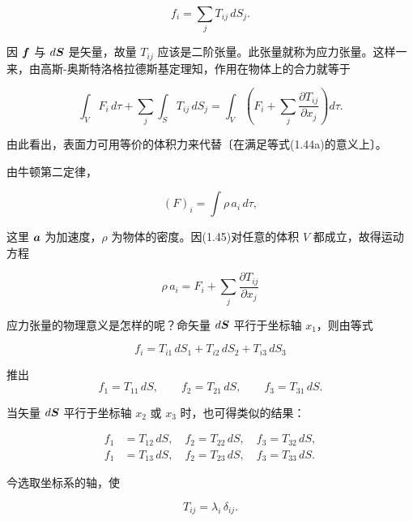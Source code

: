 \begin{equation*}
f_i = \sum_{j} T_{ij}\, dS_j.
\end{equation*}

因 $\bm{f}$ 与 $d\bm{S}$ 是矢量，故量 $T_{ij}$ 应该是二阶张量。此张量就称为应力张量。这样一来，由高斯-奥斯特洛格拉德斯基定理知，作用在物体上的合力就等于

\begin{equation}
\int_{V} F_i\, d\tau + \sum_{j} \int_{S} T_{ij}\, dS_j = \int_{V} \left(F_i + \sum_{j} \frac{\partial T_{ij}}{\partial x_j}\right) d\tau.
\tag{1.44a}
\end{equation}

由此看出，表面力可用等价的体积力来代替〔在满足等式(1.44a)的意义上〕。

由牛顿第二定律，

\begin{equation}
(F)_i = \int \rho\, a_i\, d\tau,
\tag{1.45}
\end{equation}

这里 $\bm{a}$ 为加速度，$\rho$ 为物体的密度。因(1.45)对任意的体积 $V$ 都成立，故得运动方程

\begin{equation}
\rho\, a_i = F_i + \sum_{j} \frac{\partial T_{ij}}{\partial x_j}
\tag{1.46}
\end{equation}

应力张量的物理意义是怎样的呢？命矢量 $d\bm{S}$ 平行于坐标轴 $x_1$，则由等式

\begin{equation*}
f_i = T_{i1}\, dS_1 + T_{i2}\, dS_2 + T_{i3}\, dS_3
\end{equation*}

推出
\begin{equation*}
f_1 = T_{11}\, dS, \qquad f_2 = T_{21}\, dS, \qquad f_3 = T_{31}\, dS.
\end{equation*}

当矢量 $d\bm{S}$ 平行于坐标轴 $x_2$ 或 $x_3$ 时，也可得类似的结果：

\begin{equation*}
\begin{aligned}
f_1 &= T_{12}\, dS, \quad f_2 = T_{22}\, dS, \quad f_3 = T_{32}\, dS,\\
f_1 &= T_{13}\, dS, \quad f_2 = T_{23}\, dS, \quad f_3 = T_{33}\, dS.
\end{aligned}
\end{equation*}

今选取坐标系的轴，使

\begin{equation*}
T_{ij} = \lambda_i\, \delta_{ij}.
\end{equation*}

